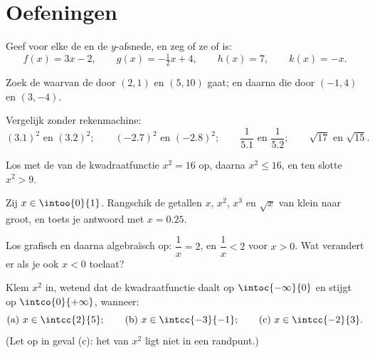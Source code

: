 \section{Oefeningen}

\begin{exercise}[$\star$]\label{exo:g10:reffunc:1}
Geef voor elke  de  en de $y$-afsnede, en
zeg of ze  of  is:
\[
f(x) = 3x - 2, \qquad
g(x) = -\tfrac12 x + 4, \qquad
h(x) = 7, \qquad
k(x) = -x .
\]
\end{exercise}

\begin{exercise}[$\star$]\label{exo:g10:reffunc:2}
Zoek de  waarvan de  door $(2, 1)$ en $(5, 10)$ gaat;
en daarna die door $(-1, 4)$ en $(3, -4)$.
\end{exercise}

\begin{exercise}[$\star$]\label{exo:g10:reffunc:3}
Vergelijk zonder rekenmachine:
\[
(3.1)^2 \text{ en } (3.2)^2; \qquad
(-2.7)^2 \text{ en } (-2.8)^2; \qquad
\frac{1}{5.1} \text{ en } \frac{1}{5.2}; \qquad
\sqrt{17} \text{ en } \sqrt{15}.
\]
\end{exercise}

\begin{exercise}[$\star$]\label{exo:g10:reffunc:4}
Los met de  van de kwadraatfunctie $x^2 = 16$ op, daarna
$x^2 \leq 16$, en ten slotte $x^2 > 9$.
\end{exercise}

\begin{exercise}[$\star$]\label{exo:g10:reffunc:5}
Zij $x \in \intoo{0}{1}$. Rangschik de getallen $x$, $x^2$, $x^3$ en
$\sqrt x$ van klein naar groot, en toets je antwoord met $x = 0.25$.
\end{exercise}

\begin{exercise}[$\star\star$]\label{exo:g10:reffunc:6}
Los grafisch en daarna algebraïsch op: $\dfrac1x = 2$, en $\dfrac1x < 2$
voor $x > 0$. Wat verandert er als je ook $x < 0$ toelaat?
\end{exercise}

\begin{exercise}[$\star\star$]\label{exo:g10:reffunc:7}
Klem $x^2$ in, wetend dat de kwadraatfunctie daalt op $\intoc{-\infty}{0}$
en stijgt op $\intco{0}{+\infty}$, wanneer:
\[
\text{(a) } x \in \intcc{2}{5};
\qquad
\text{(b) } x \in \intcc{-3}{-1};
\qquad
\text{(c) } x \in \intcc{-2}{3}.
\]
(Let op in geval (c): het  van $x^2$ ligt niet in een randpunt.)
\end{exercise}

